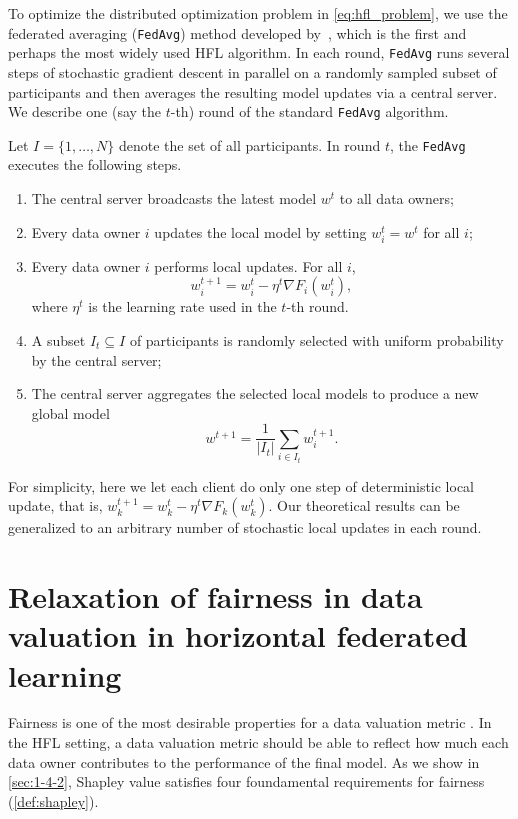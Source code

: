 To optimize the distributed optimization problem in \eqref{eq:hfl_problem}, we use the federated averaging (\texttt{FedAvg}) method developed by~\citet{mcmahan2017communication}, which is the first and perhaps the most widely used HFL algorithm. In each round, \texttt{FedAvg} runs several steps of stochastic gradient descent in parallel on a randomly sampled subset of participants and then averages the resulting model updates via a central server. We describe one (say the $t$-th) round of the standard \texttt{FedAvg} algorithm. 

Let $I = \{1, \dots, N\}$ denote the set of all participants. In round $t$, the \texttt{FedAvg} executes the following steps.
\begin{enumerate}
    \item The central server broadcasts the latest model $w^t$ to all data owners;
    \item Every data owner $i$ updates the local model by setting $w_i^t = w^t$ for all $i$;
    \item Every data owner $i$ performs local updates. For all $i$,
    \begin{equation} \label{eq:local_step}
        w_i^{t+1} = w_i^t - \eta^t \nabla F_i(w_i^t),
    \end{equation}
    where $\eta^t$ is the learning rate used in the $t$-th round. 
    \item A subset $I_t \subseteq I$ of participants is randomly selected with uniform probability by the central server;
    \item The central server aggregates the selected local models to produce a new global model
    \begin{equation} \label{eq:global_step}
        w^{t+1} = \frac{1}{|I_t|} \sum_{i \in I_t} w_i^{t+1}.
    \end{equation}
\end{enumerate}

For simplicity, here we let each client do only one step of deterministic local update, that is, $w_k^{t+1} = w_k^t - \eta^t \nabla F_k(w_k^t)$. Our theoretical results can be generalized to an arbitrary number of stochastic local updates in each round. 

\section{Relaxation of fairness in data valuation in horizontal federated learning} \label{sec:7-4}

Fairness is one of the most desirable properties for a data valuation metric \citep{ghorbani2019data,pei2020survey}. In the HFL setting, a data valuation metric should be able to reflect how much each data owner contributes to the performance of the final model. As we show in \autoref{sec:1-4-2}, Shapley value satisfies four foundamental requirements for fairness (\autoref{def:shapley}). 


